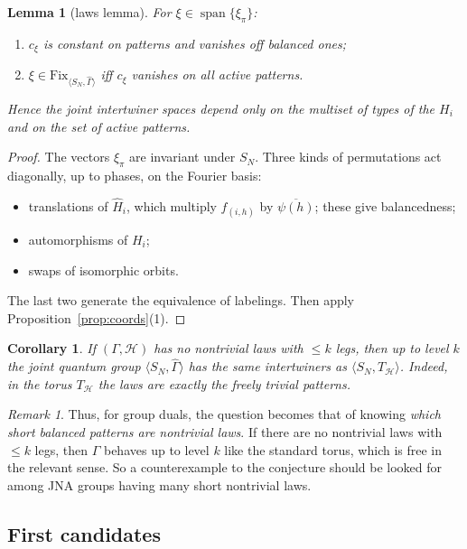 \documentclass[11pt]{amsart}
\newtheorem{lemma}[theorem]{Lemma}
\newtheorem{corollary}[theorem]{Corollary}
\theoremstyle{definition}
\theoremstyle{remark}
\newtheorem{remark}[theorem]{Remark}
\theoremstyle{plain}
\numberwithin{equation}{section}
\numberwithin{table}{section}
\newcommand{\Fix}{\mathrm{Fix}}
\DeclareMathOperator{\spn}{span}
\begin{document}
\begin{lemma}[laws lemma]\label{lem:laws}
For $\xi\in\spn\{\xi_\pi\}$:
\begin{enumerate}
\item $c_\xi$ is constant on patterns and vanishes off balanced ones;
\item $\xi\in\Fix_{\langle S_N,\widehat\Gamma\rangle}$ iff $c_\xi$ vanishes on all active patterns.
\end{enumerate}
Hence the joint intertwiner spaces depend only on the multiset of types of the $H_i$ and on the set of active patterns.
\end{lemma}

\begin{proof}
The vectors $\xi_\pi$ are invariant under $S_N$. Three kinds of permutations act diagonally, up to phases, on the Fourier basis:
\begin{itemize}
\item translations of $\widehat H_i$, which multiply $f_{(i,h)}$ by $\overline{\psi(h)}$; these give balancedness;
\item automorphisms of $H_i$;
\item swaps of isomorphic orbits.
\end{itemize}
The last two generate the equivalence of labelings. Then apply Proposition~\ref{prop:coords}(1).
\end{proof}

\begin{corollary}\label{cor:laws}
If $(\Gamma,\mathcal H)$ has no nontrivial laws with $\le k$ legs, then up to level $k$ the joint quantum group $\langle S_N,\widehat\Gamma\rangle$ has the same intertwiners as $\langle S_N,T_{\mathcal H}\rangle$. Indeed, in the torus $T_{\mathcal H}$ the laws are exactly the freely trivial patterns.
\end{corollary}

\begin{remark}\label{rem:laws}
Thus, for group duals, the question becomes that of knowing \emph{which short balanced patterns are nontrivial laws}. If there are no nontrivial laws with $\le k$ legs, then $\widehat\Gamma$ behaves up to level $k$ like the standard torus, which is free in the relevant sense. So a counterexample to the conjecture should be looked for among JNA groups having many short nontrivial laws.
\end{remark}

\subsection{First candidates}\label{sec:examples}
\end{document}
